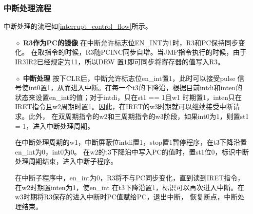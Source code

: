 \subsubsection{中断处理流程}
中断处理的流程如\ref{interrupt_control_flow}所示。
\begin{itemize}
    \item[$\diamond$ \textbf{R3作为PC的镜像}] 在中断允许标志位EN\_INT为1时，R3和PC保持同步变化。
        在取指令的时候，R3随PCINC同步自增。当JMP指令执行的时候，由于IR3\wave IR2已经规定为11，所以DRW
        置1即可同步将寄存器的值写入R3。
    \item[$\diamond$ \textbf{中断处理}] 按下CLR后，中断允许标志位en\_int置1，此时可以接受pulse
        信号使int0置1，从而进入中断。在每一个t3的下降沿，根据目前intdi和inten的状态来设置en\_int的值；对于intdi，只在st1 == 1且w1
        时期置1，inten只在IRET指令且w2周期时置1。因此，在IRET的w3时期就可以继续接受中断请求。此外，
        在双周期指令的w2和三周期指令的w3阶段，如果int0为1，则置st1 = 1，进入中断处理周期。
        \par
        在中断处理周期的w1，中断屏蔽位intdi置1，stop置1暂停程序，在t3下降沿置en\_int为0，int0为0。
        在w2的t3下降沿中写入PC的值时，置st1位0，标识中断处理周期结束，进入中断子程序。
        \par
        在中断子程序中，en\_int为0，R3将不与PC同步变化，直到读到IRET指令，在w2时期置inten为1，使en\_int
        在t3下降沿置1，标识可以再次进入中断。在w3时期将R3保存的进入中断时PC值赋给PC，退出中断，
        恢复断点，中断处理结束。
\end{itemize}